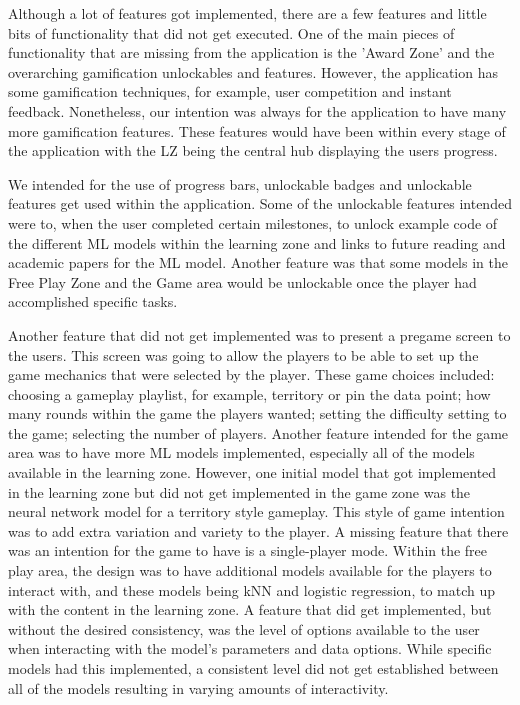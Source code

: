 		Although a lot of features got implemented, there are a few features and little bits of functionality that did not get executed. One of the main pieces of functionality that are missing from the application is the 'Award Zone' and the overarching gamification unlockables and features. However, the application has some gamification techniques, for example, user competition and instant feedback. Nonetheless, our intention was always for the application to have many more gamification features. These features would have been within every stage of the application with the LZ being the central hub displaying the users progress. 
		
		We intended for the use of progress bars, unlockable badges and unlockable features get used within the application. Some of the unlockable features intended were to, when the user completed certain milestones, to unlock example code of the different ML models within the learning zone and links to future reading and academic papers for the ML model. Another feature was that some models in the Free Play Zone and the Game area would be unlockable once the player had accomplished specific tasks.
		
		Another feature that did not get implemented was to present a pregame screen to the users. This screen was going to allow the players to be able to set up the game mechanics that were selected by the player. These game choices included: choosing a gameplay playlist, for example, territory or pin the data point;  how many rounds within the game the players wanted; setting the difficulty setting to the game; selecting the number of players. Another feature intended for the game area was to have more ML models implemented, especially all of the models available in the learning zone. However, one initial model that got implemented in the learning zone but did not get implemented in the game zone was the neural network model for a territory style gameplay. This style of game intention was to add extra variation and variety to the player. A missing feature that there was an intention for the game to have is a single-player mode. Within the free play area, the design was to have additional models available for the players to interact with, and these models being kNN and logistic regression, to match up with the content in the learning zone. A feature that did get implemented, but without the desired consistency, was the level of options available to the user when interacting with the model's parameters and data options. While specific models had this implemented, a consistent level did not get established between all of the models resulting in varying amounts of interactivity. 
		
